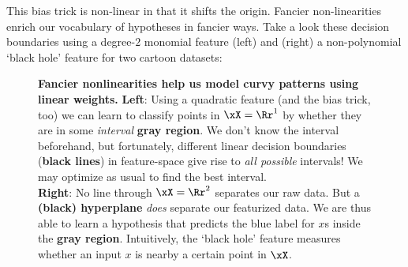   This bias trick is non-linear in that it shifts the origin.  Fancier
  non-linearities enrich our vocabulary of hypotheses in fancier ways.  Take a
  look these decision boundaries using a degree-$2$ monomial feature (left) and
  (right) a non-polynomial `black hole' feature for two cartoon datasets:
  \begin{figure}[h]
    \centering
    \caption{%
      \textbf{Fancier nonlinearities help us model curvy patterns using linear weights.}
      \textbf{Left}:
      Using a quadratic feature (and the bias trick, too) we can
      learn to classify points in $\xX=\Rr^1$ by whether they are in some
      \emph{interval} {\textbf{\dgre gray region}}.  We don't know the interval
      beforehand, but fortunately, different linear decision boundaries
      (\textbf{black lines}) in feature-space give rise to \emph{all possible}
      intervals!  We may optimize as usual to find the best interval.
      \\
      \textbf{Right}:
      No line through $\xX=\Rr^2$ separates our raw data.  But a
      \textbf{(black) hyperplane} \emph{does} separate our featurized data.  We
      are thus able to learn a hypothesis that predicts the {\blu blue} label
      for $x$s inside the {\textbf{\dgre gray region}}.
      Intuitively, the `black hole' feature measures whether an input $x$ is
      nearby a certain point in $\xX$.
    }
  \end{figure}
  \begin{marginfigure}[+4cm]
    \centering
  \end{marginfigure}

